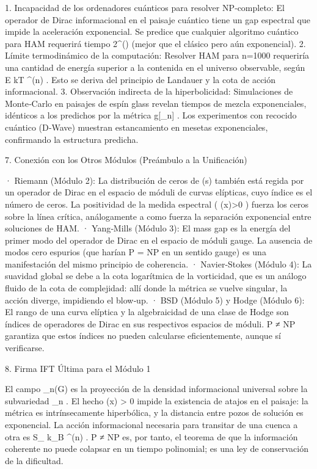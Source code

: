 \documentclass[12pt,a4paper]{book}
\begin{document}
1. Incapacidad de los ordenadores cuánticos para resolver NP‑completo: El operador de Dirac informacional en el paisaje cuántico tiene un gap espectral que impide la aceleración exponencial. Se predice que cualquier algoritmo cuántico para HAM requerirá tiempo  2^{\Omega()}  (mejor que el clásico pero aún exponencial).
2. Límite termodinámico de la computación: Resolver HAM para  n=1000  requeriría una cantidad de energía superior a la contenida en el universo observable, según  E \ge kT  ^{\Omega(n)} . Esto se deriva del principio de Landauer y la cota de acción informacional.
3. Observación indirecta de la hiperbolicidad: Simulaciones de Monte‑Carlo en paisajes de espín glass revelan tiempos de mezcla exponenciales, idénticos a los predichos por la métrica  g[\rho_n] . Los experimentos con recocido cuántico (D‑Wave) muestran estancamiento en mesetas exponenciales, confirmando la estructura predicha.

7. Conexión con los Otros Módulos (Preámbulo a la Unificación)

· Riemann (Módulo 2): La distribución de ceros de  \zeta(s)  también está regida por un operador de Dirac en el espacio de móduli de curvas elípticas, cuyo índice es el número de ceros. La positividad de la medida espectral ( \rho(x)>0 ) fuerza los ceros sobre la línea crítica, análogamente a como fuerza la separación exponencial entre soluciones de HAM.
· Yang‑Mills (Módulo 3): El mass gap es la energía del primer modo del operador de Dirac en el espacio de móduli gauge. La ausencia de modos cero espurios (que harían P = NP en un sentido gauge) es una manifestación del mismo principio de coherencia.
· Navier‑Stokes (Módulo 4): La suavidad global se debe a la cota logarítmica de la vorticidad, que es un análogo fluido de la cota de complejidad: allí donde la métrica se vuelve singular, la acción diverge, impidiendo el blow‑up.
· BSD (Módulo 5) y Hodge (Módulo 6): El rango de una curva elíptica y la algebraicidad de una clase de Hodge son índices de operadores de Dirac en sus respectivos espacios de móduli. P ≠ NP garantiza que estos índices no pueden calcularse eficientemente, aunque sí verificarse.

8. Firma IFT Última para el Módulo 1

El campo  \rho_n(G)  es la proyección de la densidad informacional universal sobre la subvariedad  _n . El hecho  \rho(x) > 0  impide la existencia de atajos en el paisaje: la métrica es intrínsecamente hiperbólica, y la distancia entre pozos de solución es exponencial. La acción informacional necesaria para transitar de una cuenca a otra es  S_{} \ge k_B  ^{\Omega(n)} . P ≠ NP es, por tanto, el teorema de que la información coherente no puede colapsar en un tiempo polinomial; es una ley de conservación de la dificultad.
\end{document}
